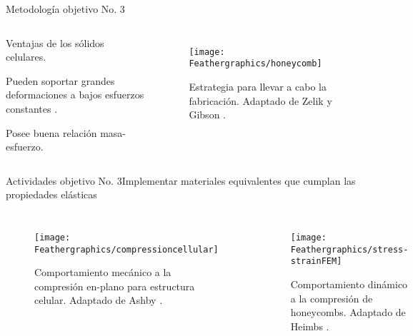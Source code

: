\documentclass[10pt]{beamer}
\begin{document}
\begin{frame}{Metodología objetivo No. 3}

\begin{columns}[t]


\column{50 mm}
\begin{block}{{\footnotesize{}Ventajas de los sólidos celulares.}}

\begin{enumerate}
\begin{footnotesize}
\item Pueden soportar grandes deformaciones a bajos esfuerzos constantes \cite{Gibson1997}.
\item Posee buena relación masa-esfuerzo.
\end{footnotesize}
\end{enumerate}
\end{block}

\column{70 mm}

\begin{figure}
\begin{centering}
\texttt{[image: Feathergraphics/honeycomb]}
\par\end{centering}
\caption{{\scriptsize{Estrategia para llevar a cabo la fabricación. Adaptado de Zelik \cite{Zelik2010} y Gibson \cite{Gibson1997}.}}}
\end{figure}

\end{columns}

\end{frame}

\begin{frame}{Actividades objetivo No. 3}{Implementar materiales equivalentes que cumplan las propiedades elásticas}
\begin{columns}
\column {60 mm}

\begin{figure}
\begin{center}
\texttt{[image: Feathergraphics/compressioncellular]}
\caption{{\footnotesize Comportamiento mecánico a la compresión en-plano para estructura celular. Adaptado de Ashby \cite{Ashby2006}.}}
\end{center}
\end{figure}

\column {65 mm}

\begin{figure}
\begin{centering}
\texttt{[image: Feathergraphics/stress-strainFEM]}
\caption{{\footnotesize Comportamiento dinámico a la compresión de honeycombs. Adaptado de Heimbs \cite{Heimbs2009}.}}
\end{centering}
\end{figure}

\end{columns}
\end{frame}
\end{document}
